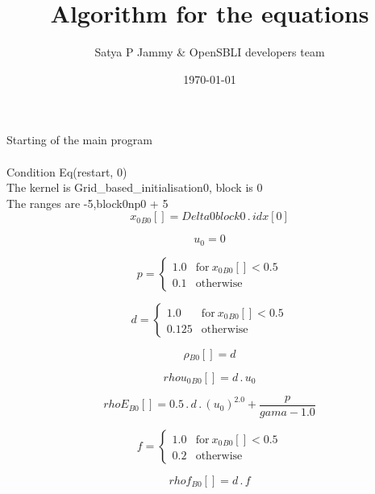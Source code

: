 \documentclass{article}
\title{Algorithm for the equations}
\author{Satya P Jammy \& OpenSBLI developers team}
\date{\today}
\begin{document}
\maketitle
\noindent Starting of the main program\\
\\\noindent Condition Eq(restart, 0)\\\noindent The kernel is Grid_based_initialisation0, block is 0\\\noindent The ranges are -5,block0np0 + 5\\\begin{dmath}{x_{0}{_{B0}}}[{}] = Delta0block0 \,.\, {idx}[{0}]\end{dmath}

\begin{dmath}u_{0} = 0\end{dmath}

\begin{dmath}p = \begin{cases} 1.0 & \text{for}\: {x_{0}{_{B0}}}[{}] < 0.5 \\0.1 & \text{otherwise} \end{cases}\end{dmath}

\begin{dmath}d = \begin{cases} 1.0 & \text{for}\: {x_{0}{_{B0}}}[{}] < 0.5 \\0.125 & \text{otherwise} \end{cases}\end{dmath}

\begin{dmath}{\rho{_{B0}}}[{}] = d\end{dmath}

\begin{dmath}{rhou_{0}{_{B0}}}[{}] = d \,.\, u_{0}\end{dmath}

\begin{dmath}{rhoE{_{B0}}}[{}] = 0.5 \,.\, d \,.\, \left(u_{0} \right)^{2.0} + \frac{p}{gama - 1.0}\end{dmath}

\begin{dmath}f = \begin{cases} 1.0 & \text{for}\: {x_{0}{_{B0}}}[{}] < 0.5 \\0.2 & \text{otherwise} \end{cases}\end{dmath}

\begin{dmath}{rhof{_{B0}}}[{}] = d \,.\, f\end{dmath}
\end{document}
